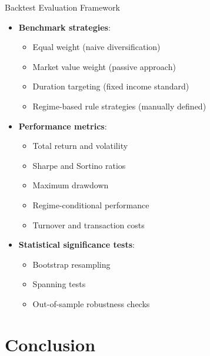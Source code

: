 \documentclass{beamer}
\begin{document}
\begin{frame}{Backtest Evaluation Framework}
\begin{itemize}
    \item \textbf{Benchmark strategies}:
    \begin{itemize}
        \item Equal weight (naive diversification)
        \item Market value weight (passive approach)
        \item Duration targeting (fixed income standard)
        \item Regime-based rule strategies (manually defined)
    \end{itemize}
    
    \item \textbf{Performance metrics}:
    \begin{itemize}
        \item Total return and volatility
        \item Sharpe and Sortino ratios
        \item Maximum drawdown
        \item Regime-conditional performance
        \item Turnover and transaction costs
    \end{itemize}
    
    \item \textbf{Statistical significance tests}:
    \begin{itemize}
        \item Bootstrap resampling
        \item Spanning tests
        \item Out-of-sample robustness checks
    \end{itemize}
\end{itemize}
\end{frame}

\section{Conclusion}

    
\end{document}
